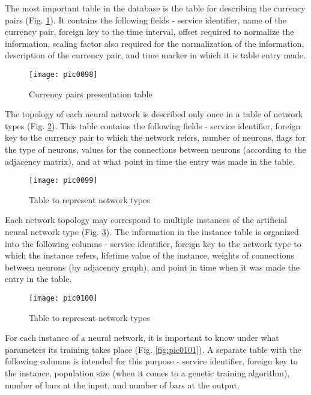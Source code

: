 The most important table in the database is the table for describing the currency pairs (Fig. \ref{fig:pic0098}). It contains the following fields - service identifier, name of the currency pair, foreign key to the time interval, offset required to normalize the information, scaling factor also required for the normalization of the information, description of the currency pair, and time marker in which it is table entry made.

\begin{figure}[h]
\centering
\texttt{[image: pic0098]}
\caption{Currency pairs presentation table}
\label{fig:pic0098}
\end{figure}
\FloatBarrier

The topology of each neural network is described only once in a table of network types (Fig. \ref{fig:pic0099}). This table contains the following fields - service identifier, foreign key to the currency pair to which the network refers, number of neurons, flags for the type of neurons, values for the connections between neurons (according to the adjacency matrix), and at what point in time the entry was made in the table.

\begin{figure}[h]
\centering
\texttt{[image: pic0099]}
\caption{Table to represent network types}
\label{fig:pic0099}
\end{figure}
\FloatBarrier

Each network topology may correspond to multiple instances of the artificial neural network type (Fig. \ref{fig:pic0100}). The information in the instance table is organized into the following columns - service identifier, foreign key to the network type to which the instance refers, lifetime value of the instance, weights of connections between neurons (by adjacency graph), and point in time when it was made the entry in the table.

\begin{figure}[h]
\centering
\texttt{[image: pic0100]}
\caption{Table to represent network types}
\label{fig:pic0100}
\end{figure}
\FloatBarrier

For each instance of a neural network, it is important to know under what parameters its training takes place (Fig. \ref{fig:pic0101}). A separate table with the following columns is intended for this purpose - service identifier, foreign key to the instance, population size (when it comes to a genetic training algorithm), number of bars at the input, and number of bars at the output.

